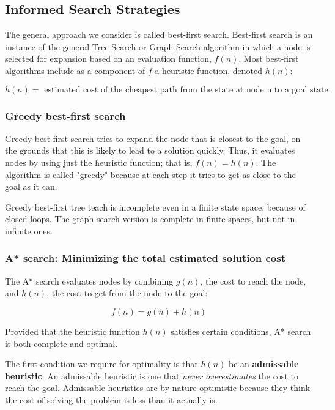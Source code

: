 \documentclass{article}
\begin{document}
\subsection{Informed Search Strategies}

The general approach we consider is called best-first search. Best-first search is an instance of the general Tree-Search or Graph-Search algorithm in which a node is selected for expansion based on an evaluation function, $ f(n) $. Most best-first algorithms include as a component of $ f $ a heuristic function, denoted $ h(n) $:

$$ h(n) = \text{ estimated cost of the cheapest path from the state at node n to a goal state.} $$

\subsubsection{Greedy best-first search}

Greedy best-first search tries to expand the node that is closest to the goal, on the grounds that this is likely to lead to a solution quickly. Thus, it evaluates nodes by using just the heuristic function; that is, $ f(n) = h(n) $. The algorithm is called "greedy" because at each step it tries to get as close to the goal as it can.

Greedy best-first tree teach is incomplete even in a finite state space, because of closed loops. The graph search version is complete in finite spaces, but not in infinite ones.

\subsubsection{A* search: Minimizing the total estimated solution cost}

The A* search evaluates nodes by combining $ g(n) $, the cost to reach the node, and $ h(n) $, the cost to get from the node to the goal:

$$ f(n) = g(n) + h(n) $$

Provided that the heuristic function $ h(n) $ satisfies certain conditions, A* search is both complete and optimal.

The first condition we require for optimality is that $ h(n) $ be an \textbf{admissable heuristic}. An admissable heuristic is one that \textit{never overestimates} the cost to reach the goal. Admissable heuristics are by nature optimistic because they think the cost of solving the problem is less than it actually is.
\end{document}

